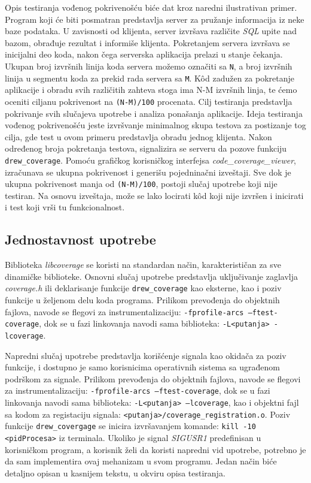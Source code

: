 \documentclass[12pt,oneside]{memoir}
\newcommand{\kod}[1]{\texttt{#1}}
\newcommand{\strano}[1]{\textit{#1}}
\begin{document}
Opis testiranja vođenog pokrivenošću biće dat kroz naredni ilustrativan primer. Program koji će biti posmatran predstavlja server za pružanje informacija iz neke baze podataka. U zavisnosti od klijenta, server izvršava različite \strano{SQL} upite nad bazom, obrađuje rezultat i informiše klijenta. Pokretanjem servera izvršava se inicijalni deo koda, nakon čega serverska aplikacija prelazi u stanje čekanja. Ukupan broj izvršnih linija koda servera možemo označiti sa \kod{N}, a broj izvršnih linija u segmentu koda za prekid rada servera sa \kod{M}. K\^{o}d zadužen za pokretanje aplikacije i obradu svih različitih zahteva stoga ima N-M izvršnih linja, te ćemo oceniti ciljanu pokrivenost na \kod{(N-M)/100} procenata. Cilj testiranja predstavlja pokrivanje svih slučajeva upotrebe i analiza ponašanja aplikacije. Ideja testiranja vođenog pokrivenošću jeste izvršvanje minimalnog skupa testova za postizanje tog cilja, gde test u ovom primeru predstavlja obradu jednog klijenta. Nakon određenog broja pokretanja testova, signalizira se serveru da pozove funkciju \kod{drew\_coverage}. Pomoću grafičkog korisničkog interfejsa \strano{code\_coverage\_viewer}, izračunava se ukupna pokrivenost i generišu pojedninačni izveštaji. Sve dok je ukupna pokrivenost manja od \kod{(N-M)/100}, postoji slučaj upotrebe koji nije testiran. Na osnovu izveštaja, može se lako locirati k\^{o}d koji nije izvršen i inicirati i test koji vrši tu funkcionalnost.

\subsection{Jednostavnost upotrebe}

Biblioteka \strano{libcoverage} se koristi na standardan način, karakterističan za sve dinamičke biblioteke. Osnovni slučaj upotrebe predstavlja uključivanje zaglavlja \strano{coverage.h} ili deklarisanje funkcije \kod{drew\_coverage} kao eksterne, kao i poziv funkcije u željenom delu koda programa. Prilikom prevođenja do objektnih fajlova, navode se flegovi za instrumentalizaciju: \kod{-fprofile-arcs –ftest-coverage}, dok se u fazi linkovanja navodi sama biblioteka: \kod{-L<putanja> -lcoverage}.

Napredni slučaj upotrebe predstavlja korišćenje signala kao okidača za poziv funkcije, i dostupno je samo korisnicima operativnih sistema sa ugrađenom podrškom za signale. Prilikom prevođenja do objektnih fajlova, navode se flegovi za instrumentalizaciju: \kod{-fprofile-arcs –ftest-coverage}, dok se u fazi linkovanja navodi sama biblioteka: \kod{-L<putanja> –lcoverage}, kao i objektni fajl sa kodom za registaciju signala: \kod{<putanja>/coverage\_registration.o}. Poziv funkcije \kod{drew\_covergage} se inicira izvršavanjem komande: \kod{kill -10 <pidProcesa>} iz terminala. Ukoliko je signal \strano{SIGUSR1} predefinisan u korisničkom program, a korisnik želi da koristi napredni vid upotrebe, potrebno je da sam implementira ovaj mehanizam u svom programu. Jedan način biće detaljno opisan u kasnijem tekstu, u okviru opisa testiranja. 
\end{document}
